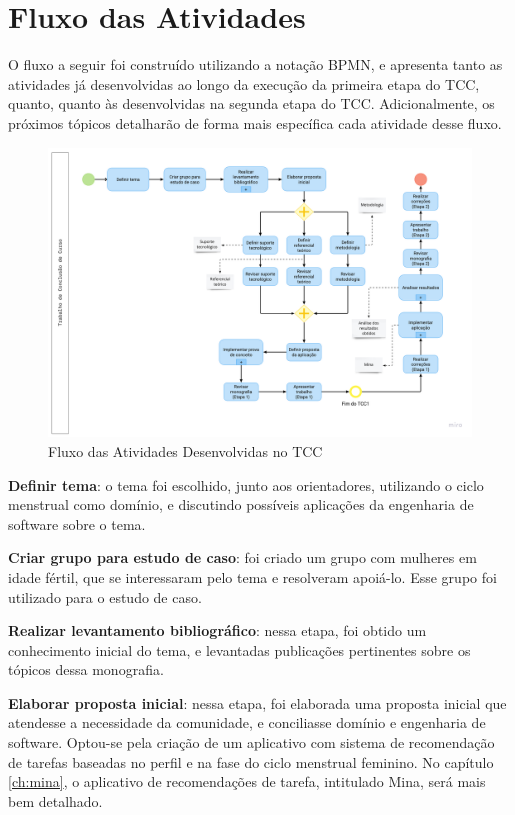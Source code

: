 \section{Fluxo das Atividades}
\label{42}
O fluxo a seguir foi construído utilizando a notação BPMN, e apresenta 
tanto as atividades já desenvolvidas ao longo da execução 
da primeira etapa do TCC, quanto, quanto às desenvolvidas na segunda etapa do TCC. 
Adicionalmente, os próximos tópicos detalharão de 
forma mais específica cada atividade desse fluxo.

\begin{figure}[ht]
	\caption{Fluxo das Atividades Desenvolvidas no TCC}
	\begin{center}
	\includegraphics[keepaspectratio=true,scale=0.19]{figuras/fluxodeatividades.png}
	\end{center}
    \label{fig03}
\end{figure}

\textbf{Definir tema}: o tema foi escolhido, junto aos orientadores, utilizando o ciclo 
menstrual como domínio, e discutindo
possíveis aplicações da engenharia de software sobre o tema. 

\textbf{Criar grupo para estudo de caso}: foi criado um grupo com mulheres em idade 
fértil, 
que se interessaram pelo tema e resolveram apoiá-lo. Esse grupo foi utilizado 
para o estudo de caso.

\textbf{Realizar levantamento bibliográfico}: nessa etapa, foi obtido um conhecimento 
inicial do tema, e levantadas publicações pertinentes sobre os tópicos dessa monografia. 

\textbf{Elaborar proposta inicial}: nessa etapa, foi elaborada uma proposta inicial que 
atendesse a necessidade da comunidade, e conciliasse domínio e engenharia de software. 
Optou-se pela criação de um aplicativo com sistema de recomendação de tarefas baseadas 
no perfil e
na fase do ciclo menstrual feminino. No capítulo \ref{ch:mina}, o aplicativo de recomendações de 
tarefa, intitulado Mina, será 
mais bem detalhado.

